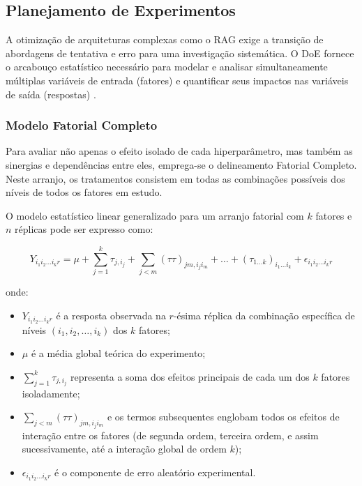 \subsection{Planejamento de Experimentos}

A otimização de arquiteturas complexas como o RAG exige a transição de abordagens de tentativa e erro para uma investigação sistemática. O DoE fornece o arcabouço estatístico necessário para modelar e analisar simultaneamente múltiplas variáveis de entrada (fatores) e quantificar seus impactos nas variáveis de saída (respostas) \citep{montgomery2017}.

\subsubsection{Modelo Fatorial Completo}

Para avaliar não apenas o efeito isolado de cada hiperparâmetro, mas também as sinergias e dependências entre eles, emprega-se o delineamento Fatorial Completo. Neste arranjo, os tratamentos consistem em todas as combinações possíveis dos níveis de todos os fatores em estudo.

O modelo estatístico linear generalizado para um arranjo fatorial com $k$ fatores e $n$ réplicas pode ser expresso como:

\begin{equation}
  Y_{i_1 i_2 \dots i_k r} = \mu + \sum_{j=1}^{k} \tau_{j, i_j} + \sum_{j < m} (\tau\tau)_{jm, i_j i_m} + \dots + (\tau_{1\dots k})_{i_1 \dots i_k} + \epsilon_{i_1 i_2 \dots i_k r}
\end{equation}

\noindent onde:
\begin{itemize}
  \item $Y_{i_1 i_2 \dots i_k r}$ é a resposta observada na $r$-ésima réplica da combinação específica de níveis $(i_1, i_2, \dots, i_k)$ dos $k$ fatores;
  \item $\mu$ é a média global teórica do experimento;
  \item $\sum_{j=1}^{k} \tau_{j, i_j}$ representa a soma dos efeitos principais de cada um dos $k$ fatores isoladamente;
  \item $\sum_{j < m} (\tau\tau)_{jm, i_j i_m}$ e os termos subsequentes englobam todos os efeitos de interação entre os fatores (de segunda ordem, terceira ordem, e assim sucessivamente, até a interação global de ordem $k$);
  \item $\epsilon_{i_1 i_2 \dots i_k r}$ é o componente de erro aleatório experimental.
\end{itemize}

